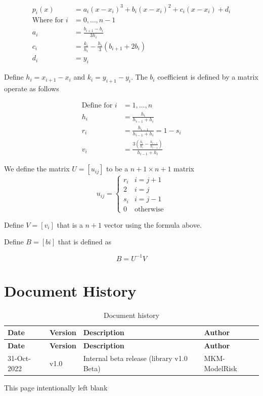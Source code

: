 \documentclass[11pt]{article}
\begin{document}
\begin{align}
	p_i(x) &= a_i(x-x_i)^3 + b_i(x-x_i)^2 + c_i(x-x_i)+d_i \\
	\text{Where for } i &= 0, \dots , n-1\\
	a_ i &= \displaystyle \frac{b_{i+1}-b_i}{3h_i} \\
	c_i &= \displaystyle \frac{k_i}{h_i} - \displaystyle \frac{h_i}{3}(b_{i+1} + 2b_i) \\
	d_i &= y_i 
\end{align}

Define $h_i = x_{i+1} - x_i$ and $k_i = y_{i+1} - y_i$.  The $b_i$ coefficient is defined by a matrix operate as follows \par

\begin{align}
	\text{Define for } i &= 1, \dots ,n \\
	h_ i &= \displaystyle \frac{h_i}{h_{i-1} + h_i} \\
	r_ i &= \displaystyle \frac{h_{i-1}}{h_{i-1} + h_i} = 1 - s_i \\
	v_i &= \displaystyle \frac {3 \left (\frac{k_i}{h_i} - \frac{k_{i-1}}{h_{i-1}} \right ) }{h_{i-1}+h_i}
\end{align}

We define the matrix $U=[u_{ij}]$ to be a $n+1 \times n+1$ matrix 
\begin{equation}
	u_{ij} = \begin{cases}
		r_i  &  i = j+1 \\
		2 & i = j \\
		s_i & i = j-1 \\
		0  & \text{otherwise}
	\end{cases}
\end{equation}

Define $V=[v_i]$ that is a $n+1$ vector using the formula above. \par
Define $B=[bi]$ that is defined as \par
\begin{equation}
	B=U^{-1} V
\end{equation} 


\clearpage

\section{Document History}
\begin{longtable}{llll}
\caption{Document history}\\
\toprule
\textbf{Date} & \textbf{Version} & \textbf{Description} & \textbf{Author} \\
\midrule
\endfirsthead
\toprule
\textbf{Date} & \textbf{Version} & \textbf{Description} & \textbf{Author} \\
\midrule
\endhead
31-Oct-2022 & v1.0 & Internal beta release (library v1.0 Beta) & MKM-ModelRisk \\
\bottomrule
\end{longtable}

\clearpage




\clearpage
\begin{appendices}

This page intentionally left blank

\end{appendices}
\end{document}
